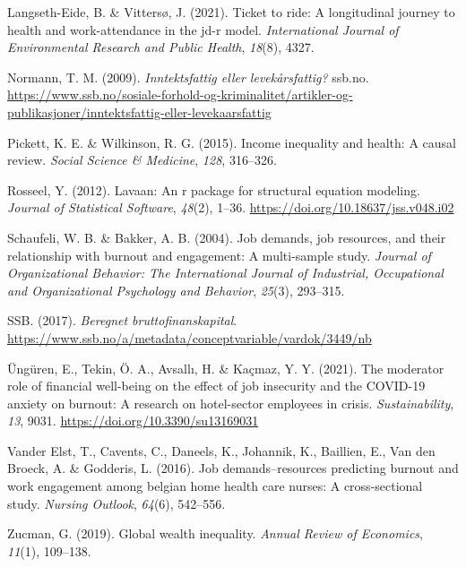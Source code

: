 \documentclass[
  12pt,
  a4paper,
  DIV=11,
  numbers=noendperiod]{scrartcl}
\newlength{\cslhangindent}
\newenvironment{CSLReferences}[2] %
 {\begin{list}{}{%
  \setlength{\itemindent}{0pt}
  \setlength{\leftmargin}{0pt}
  \setlength{\parsep}{0pt}
  \ifodd #1
   \setlength{\leftmargin}{\cslhangindent}
   \setlength{\itemindent}{-1\cslhangindent}
  \fi
  \setlength{\itemsep}{#2\baselineskip}}}
 {\end{list}}
\begin{document}
\begin{CSLReferences}{1}{0}
Langseth-Eide, B. \& Vittersø, J. (2021). Ticket to ride: A longitudinal
journey to health and work-attendance in the jd-r model.
\emph{International Journal of Environmental Research and Public
Health}, \emph{18}(8), 4327.

Normann, T. M. (2009). \emph{Inntektsfattig eller levekårsfattig?}
ssb.no.
\url{https://www.ssb.no/sosiale-forhold-og-kriminalitet/artikler-og-publikasjoner/inntektsfattig-eller-levekaarsfattig}

Pickett, K. E. \& Wilkinson, R. G. (2015). Income inequality and health:
A causal review. \emph{Social Science \& Medicine}, \emph{128},
316--326.

Rosseel, Y. (2012). Lavaan: An r package for structural equation
modeling. \emph{Journal of Statistical Software}, \emph{48}(2), 1--36.
\url{https://doi.org/10.18637/jss.v048.i02}

Schaufeli, W. B. \& Bakker, A. B. (2004). Job demands, job resources,
and their relationship with burnout and engagement: A multi-sample
study. \emph{Journal of Organizational Behavior: The International
Journal of Industrial, Occupational and Organizational Psychology and
Behavior}, \emph{25}(3), 293--315.

SSB. (2017). \emph{Beregnet bruttofinanskapital}.
\url{https://www.ssb.no/a/metadata/conceptvariable/vardok/3449/nb}

Üngüren, E., Tekin, Ö. A., Avsallı, H. \& Kaçmaz, Y. Y. (2021). The
moderator role of financial well-being on the effect of job insecurity
and the COVID-19 anxiety on burnout: A research on hotel-sector
employees in crisis. \emph{Sustainability}, \emph{13}, 9031.
\url{https://doi.org/10.3390/su13169031}

Vander Elst, T., Cavents, C., Daneels, K., Johannik, K., Baillien, E.,
Van den Broeck, A. \& Godderis, L. (2016). Job demands--resources
predicting burnout and work engagement among belgian home health care
nurses: A cross-sectional study. \emph{Nursing Outlook}, \emph{64}(6),
542--556.

Zucman, G. (2019). Global wealth inequality. \emph{Annual Review of
Economics}, \emph{11}(1), 109--138.

\end{CSLReferences}
\end{document}
